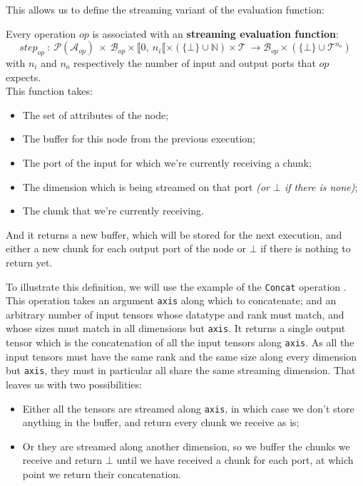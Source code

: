 \documentclass[11pt]{article}
\begin{document}
\noindent
This allows us to define the streaming variant of the evaluation function:

\begin{definition}Every operation $op$ is associated with an \textbf{streaming evaluation function}:
$$step_{op} \ :\ \mathcal{P}(\mathcal{A}_{op})\ \times \ \mathcal{B}_{op} \times \llbracket 0,\ n_i \llbracket \times (\{\bot\} \cup \mathbb{N}) \times \mathcal{T} \ \rightarrow  \mathcal{B}_{op} \times (\{\bot\} \cup \mathcal{T}^{n_o})$$
with $n_i$ and $n_o$ respectively the number of input and output ports that $op$ expects.\\

\noindent
This function takes:
\begin{itemize}[noitemsep]
    \item The set of attributes of the node;
    \item The buffer for this node from the previous execution;
    \item The port of the input for which we're currently receiving a chunk;
    \item The dimension which is being streamed on that port \textit{(or $\bot$ if there is none)};
    \item The chunk that we're currently receiving.
\end{itemize}

\noindent
And it returns a new buffer, which will be stored for the next execution, and either a new chunk for each output port of the node or $\bot$ if there is nothing to return yet.\\
\end{definition}

To illustrate this definition, we will use the example of the \texttt{Concat} operation \cite{tensorflow-concat}. This operation takes an argument \texttt{axis} along which to concatenate; and an arbitrary number of input tensors whose datatype and rank must match, and whose sizes must match in all dimensions but \texttt{axis}. It returns a single output tensor which is the concatenation of all the input tensors along \texttt{axis}. As all the input tensors must have the same rank and the same size along every dimension but \texttt{axis}, they must in particular all share the same streaming dimension. That leaves us with two possibilities:

\begin{itemize}[noitemsep]
    \item Either all the tensors are streamed along \texttt{axis}, in which case we don't store anything in the buffer, and return every chunk we receive as is;
    \item Or they are streamed along another dimension, so we buffer the chunks we receive and return $\bot$ until we have received a chunk for each port, at which point we return their concatenation.
\end{itemize}
\end{document}
